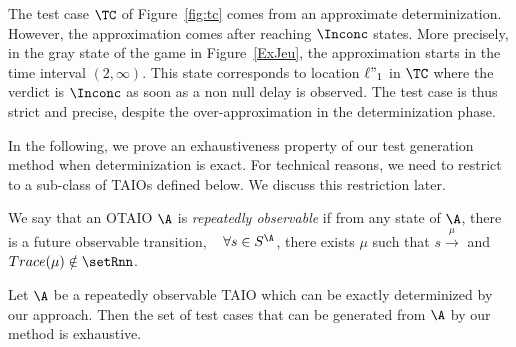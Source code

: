 \documentclass{LMCS}
\theoremstyle{plain}\newtheorem{proposition}[thm]{Proposition}
\begin{document}
\begin{exa}
The test case $\TC$ of Figure~\ref{fig:tc} comes from an approximate determinization. 
However, the approximation comes after reaching $\Inconc$ states.
More precisely, in the gray state of the game in Figure~\ref{ExJeu},
the approximation starts in the time interval $(2,\infty)$.
This state corresponds to location $\ell"_1$ in $\TC$
where the verdict is $\Inconc$ as soon as a non null delay is observed.
The test case is thus strict and precise, despite the over-approximation
in the determinization phase.
\end{exa}



In the following, we prove an exhaustiveness property of our test generation method when determinization is exact.
For technical reasons, we need to restrict to a sub-class of TAIOs defined below.
We discuss this restriction later.

\begin{defi}
We say that an OTAIO $\A$ is {\em repeatedly observable}
if from any state of $\A$, there is a future observable transition,
\ie~ 
$\forall s \in S^\A$, there exists $\mu$ such that 
$s \xrightarrow{\mu}$ and  $Trace(\mu)\notin \setRnn$.  
\end{defi}


\begin{thm}[Exhaustiveness]
\label{th:exhaustiveness}
Let $\A$ be a repeatedly observable TAIO which can be exactly
determinized by our approach.  Then the set of test cases that can be
generated from $\A$ by our method is exhaustive.
\end{thm}
\end{document}
